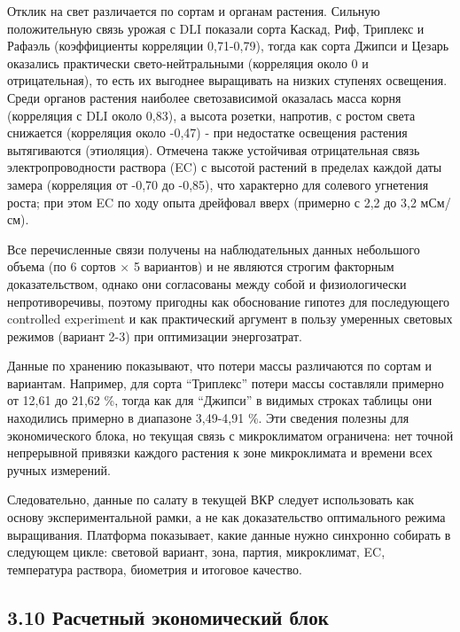 \documentclass[a4paper,14pt]{extarticle}
\begin{document}
Отклик на свет различается по сортам и органам растения. Сильную
положительную связь урожая с DLI показали сорта Каскад, Риф, Триплекс и
Рафаэль (коэффициенты корреляции 0,71-0,79), тогда как сорта Джипси и
Цезарь оказались практически свето-нейтральными (корреляция около 0 и
отрицательная), то есть их выгоднее выращивать на низких ступенях
освещения. Среди органов растения наиболее светозависимой оказалась
масса корня (корреляция с DLI около 0,83), а высота розетки, напротив, с
ростом света снижается (корреляция около -0,47) - при недостатке
освещения растения вытягиваются (этиоляция). Отмечена также устойчивая
отрицательная связь электропроводности раствора (EC) с высотой растений
в пределах каждой даты замера (корреляция от -0,70 до -0,85), что
характерно для солевого угнетения роста; при этом EC по ходу опыта
дрейфовал вверх (примерно с 2,2 до 3,2 мСм/см).

Все перечисленные связи получены на наблюдательных данных небольшого
объема (по 6 сортов × 5 вариантов) и не являются строгим факторным
доказательством, однако они согласованы между собой и физиологически
непротиворечивы, поэтому пригодны как обоснование гипотез для
последующего controlled experiment и как практический аргумент в пользу
умеренных световых режимов (вариант 2-3) при оптимизации энергозатрат.

Данные по хранению показывают, что потери массы различаются по сортам и
вариантам. Например, для сорта ``Триплекс'' потери массы составляли
примерно от 12,61 до 21,62 \%, тогда как для ``Джипси'' в видимых
строках таблицы они находились примерно в диапазоне 3,49-4,91 \%. Эти
сведения полезны для экономического блока, но текущая связь с
микроклиматом ограничена: нет точной непрерывной привязки каждого
растения к зоне микроклимата и времени всех ручных измерений.

Следовательно, данные по салату в текущей ВКР следует использовать как
основу экспериментальной рамки, а не как доказательство оптимального
режима выращивания. Платформа показывает, какие данные нужно синхронно
собирать в следующем цикле: световой вариант, зона, партия, микроклимат,
EC, температура раствора, биометрия и итоговое качество.

\hypertarget{ux440ux430ux441ux447ux435ux442ux43dux44bux439-ux44dux43aux43eux43dux43eux43cux438ux447ux435ux441ux43aux438ux439-ux431ux43bux43eux43a}{%
\subsection{3.10 Расчетный экономический
блок}\label{ux440ux430ux441ux447ux435ux442ux43dux44bux439-ux44dux43aux43eux43dux43eux43cux438ux447ux435ux441ux43aux438ux439-ux431ux43bux43eux43a}}
\end{document}
